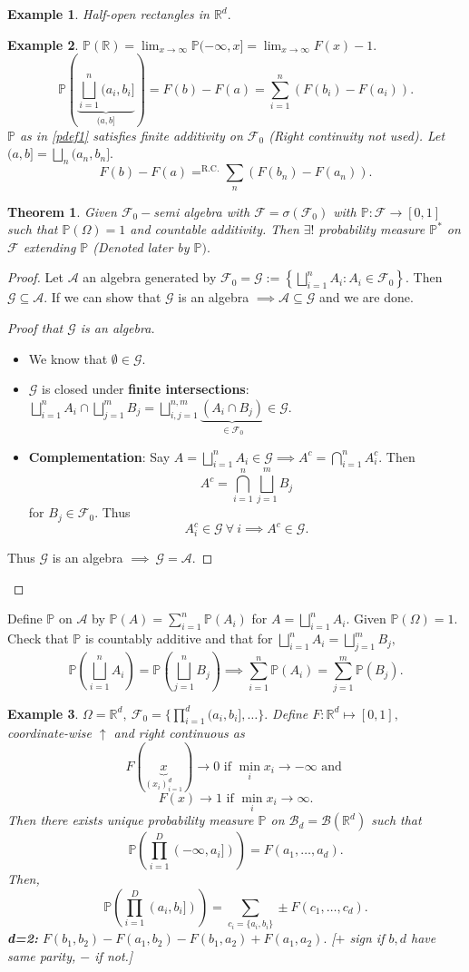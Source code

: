 \documentclass{article}
\newcommand{\1}{\mathds{1}}
\newcommand{\R}{\mathbb{R}}
\newcommand{\F}{\mathcal{F}}
\newcommand{\B}{\mathcal{B}}
\newcommand{\G}{\mathcal{G}}
\newcommand{\PB}{\mathbb{P}}
\newcommand{\A}{\mathcal{A}}
\newcommand{\lf}{\left}
\newcommand{\rg}{\right}
\newtheorem{theorem}{Theorem}[section]
\newtheorem{example}{Example}
\begin{document}
\begin{example}
Half-open rectangles in $\R^d.$ 
\end{example}
\begin{example}
    $\PB(\R)=\lim_{x\to\infty}\PB(-\infty,x]=\lim_{x\to\infty}F(x)-1.$ 
    $$\PB\lf(\underbrace{\bigsqcup_{i=1}^n(a_i,b_i]}_{(a,b]}\rg)=F(b)-F(a)=\sum_{i=1}^n (F(b_i)-F(a_i)).$$
    $\PB$ as in \ref{pdef1} satisfies finite additivity on $\F_0$ (Right continuity not used). Let $(a,b]=\bigsqcup_n(a_n,b_n].$ $$F(b)-F(a)=^\text{R.C.}\sum_n(F(b_n)-F(a_n)).$$
\end{example}
\begin{theorem}
   Given $\F_0-$semi algebra with $\F=\sigma(\F_0)$ with $\PB:\F\to [0,1]$ such that $\PB(\Omega)=1$ and countable additivity. Then $\exists!$ probability measure $\PB^*$ on $\F$ extending $\PB$ (Denoted later by $\PB).$ 
\end{theorem}
\begin{proof}
    Let $\A$ an algebra generated by $\F_0=\G:=\lf\{\bigsqcup_{i=1}^n A_i:A_i\in\F_0\rg\}.$ Then $\G\subseteq \A$. If we can show that $\G$ is an algebra $\implies \A\subseteq\G$ and we are done.
    \begin{proof}[Proof that $\G$ is an algebra]
        \begin{itemize}
            \item We know that $\emptyset\in\G.$
            \item $\G$ is closed under \textbf{finite intersections}: $\bigsqcup_{i=1}^n A_i\cap \bigsqcup_{j=1}^m B_j=\bigsqcup_{i,j=1}^{n,m}\underbrace{(A_i\cap B_j)}_{\in\F_0}\in\G$.
            \item \textbf{Complementation}: Say $A=\bigsqcup_{i=1}^nA_i\in\G\implies A^c=\bigcap_{i=1}^n A_i^c.$ Then $$A^c=\bigcap_{i=1}^n\bigsqcup_{j=1}^m B_j$$ for $B_j\in\F_0.$ Thus $$A_i^c\in\G\ \forall\ i\implies A^c\in\G.$$ 
        \end{itemize}
        Thus $\G$ is an algebra $\implies\ \G=\A.$
    \end{proof}
\end{proof}
Define $\PB$ on $\A$ by $\PB(A)=\sum_{i=1}^n \PB(A_i)$ for $A=\bigsqcup_{i=1}^n A_i.$ Given $\PB(\Omega)=1.$ Check that $\PB$ is countably additive and that for $\bigsqcup_{i=1}^n A_i=\bigsqcup_{j=1}^m B_j,$$$\PB\lf(\bigsqcup_{i=1}^n A_i\rg)=\PB\lf(\bigsqcup_{j=1}^n B_j\rg)\implies \sum_{i=1}^n \PB(A_i)=\sum_{j=1}^m \PB(B_j).$$
\begin{example}
    $\Omega=\R^d,\ \F_0=\{\prod_{i=1}^d (a_i,b_i],\ldots\}.$ Define $F:\R^d\mapsto [0,1],$ coordinate-wise $\uparrow$ and right continuous as $$F(\underbrace{x}_{(x_i)_{i=1}^d})\to 0\text{ if }\min_i x_i\to -\infty\text{ and }$$ $$F(x)\to 1\text{ if }\min_i x_i\to\infty.$$ Then there exists unique probability measure $\PB$ on $\B_d=\B(\R^d)$ such that $$\PB\lf(\prod_{i=1}^D (-\infty,a_i])\rg)=F(a_1,\ldots, a_d).$$ Then, $$\PB\lf(\prod_{i=1}^D (a_i,b_i])\rg)=\sum_{c_i=\{a_i,b_i\}}\pm F(c_1,\ldots ,c_d).$$
    \textbf{d=2:} $F(b_1,b_2)-F(a_1,b_2)-F(b_1,a_2)+F(a_1,a_2).$ [$+$ sign if $b,d$ have same parity, $-$ if not.] 
\end{example}
\end{document}
